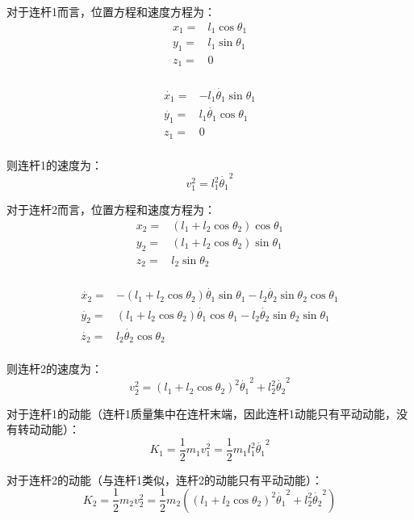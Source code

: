 \documentclass{homework}
\begin{document}
\question

\begin{sol}


对于连杆1而言，位置方程和速度方程为： 
\begin{align*}
  x_1 =& l_1 \cos\theta_1 \\
  y_1 =& l_1 \sin\theta_1 \\
  z_1 =& 0 \\
\end{align*}

\begin{align*}
  \dot{x_1} =& - l_1 \dot{\theta_1} \sin\theta_1 \\
  \dot{y_1} =& l_1 \dot{\theta_1} \cos\theta_1 \\
  z_1 =& 0 \\
\end{align*}

则连杆1的速度为：
\[
  v_1^2 = l_1^2 \dot{\theta_1}^2
\]

对于连杆2而言，位置方程和速度方程为： 
\begin{align*}
  x_2 = & (l_1 + l_2 \cos\theta_2) \cos\theta_1 \\
  y_2 = & (l_1 + l_2 \cos\theta_2) \sin\theta_1 \\
  z_2 = & l_2 \sin\theta_2 \\
\end{align*}

\begin{align*}
  \dot{x_2} = & - (l_1 + l_2 \cos\theta_2) \dot{\theta_1} \sin\theta_1 - l_2 \dot{\theta_2} \sin\theta_2 \cos\theta_1 \\
  \dot{y_2} = & (l_1 + l_2 \cos\theta_2) \dot{\theta_1} \cos\theta_1 - l_2 \dot{\theta_2} \sin\theta_2 \sin\theta_1 \\
  \dot{z_2} = & l_2 \dot{\theta_2} \cos\theta_2 \\
\end{align*}

则连杆2的速度为：
\[
  v_2^2 = (l_1 + l_2 \cos\theta_2)^2 \dot{\theta_1}^2 + l_2^2 \dot{\theta_2}^2
\]

对于连杆1的动能（连杆1质量集中在连杆末端，因此连杆1动能只有平动动能，没有转动动能）：
\[
  K_1 = \frac{1}{2} m_1 v_1^2 = \frac{1}{2} m_1 l_1^2 \dot{\theta_1}^2
\]

对于连杆2的动能（与连杆1类似，连杆2的动能只有平动动能）：
\[
  K_2 = \frac{1}{2} m_2 v_2^2 = \frac{1}{2} m_2 ((l_1 + l_2 \cos\theta_2)^2 \dot{\theta_1}^2 + l_2^2 \dot{\theta_2}^2)
\]


\end{sol}
\end{document}
